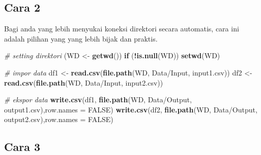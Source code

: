 \documentclass[
]{book}
\newenvironment{Shaded}{\begin{snugshade}}{\end{snugshade}}
\newcommand{\AttributeTok}[1]{\textcolor[rgb]{0.13,0.29,0.53}{#1}}
\newcommand{\CommentTok}[1]{\textcolor[rgb]{0.56,0.35,0.01}{\textit{#1}}}
\newcommand{\ConstantTok}[1]{\textcolor[rgb]{0.56,0.35,0.01}{#1}}
\newcommand{\ControlFlowTok}[1]{\textcolor[rgb]{0.13,0.29,0.53}{\textbf{#1}}}
\newcommand{\FunctionTok}[1]{\textcolor[rgb]{0.13,0.29,0.53}{\textbf{#1}}}
\newcommand{\NormalTok}[1]{#1}
\newcommand{\OtherTok}[1]{\textcolor[rgb]{0.56,0.35,0.01}{#1}}
\newcommand{\SpecialCharTok}[1]{\textcolor[rgb]{0.81,0.36,0.00}{\textbf{#1}}}
\newcommand{\StringTok}[1]{\textcolor[rgb]{0.31,0.60,0.02}{#1}}
\begin{document}
\hypertarget{cara-2}{%
\subsection{Cara 2}\label{cara-2}}

Bagi anda yang lebih menyukai koneksi direktori secara automatis, cara ini adalah pilihan yang yang lebih bijak dan praktis.

\begin{Shaded}
\begin{Highlighting}[]
\CommentTok{\# setting direktori}
\NormalTok{(WD }\OtherTok{\textless{}{-}} \FunctionTok{getwd}\NormalTok{())}
\ControlFlowTok{if}\NormalTok{ (}\SpecialCharTok{!}\FunctionTok{is.null}\NormalTok{(WD)) }\FunctionTok{setwd}\NormalTok{(WD)}
\end{Highlighting}
\end{Shaded}

\begin{Shaded}
\begin{Highlighting}[]
\CommentTok{\# impor data}
\NormalTok{df1 }\OtherTok{\textless{}{-}} \FunctionTok{read.csv}\NormalTok{(}\FunctionTok{file.path}\NormalTok{(WD, }\StringTok{\textquotesingle{}Data/Input\textquotesingle{}}\NormalTok{, }\StringTok{\textquotesingle{}input1.csv\textquotesingle{}}\NormalTok{))}
\NormalTok{df2 }\OtherTok{\textless{}{-}} \FunctionTok{read.csv}\NormalTok{(}\FunctionTok{file.path}\NormalTok{(WD, }\StringTok{\textquotesingle{}Data/Input\textquotesingle{}}\NormalTok{, }\StringTok{\textquotesingle{}input2.csv\textquotesingle{}}\NormalTok{))}

\CommentTok{\# ekspor data}
\FunctionTok{write.csv}\NormalTok{(df1, }\FunctionTok{file.path}\NormalTok{(WD, }\StringTok{\textquotesingle{}Data/Output\textquotesingle{}}\NormalTok{, }\StringTok{\textquotesingle{}output1.csv\textquotesingle{}}\NormalTok{),}\AttributeTok{row.names =} \ConstantTok{FALSE}\NormalTok{)}
\FunctionTok{write.csv}\NormalTok{(df2, }\FunctionTok{file.path}\NormalTok{(WD, }\StringTok{\textquotesingle{}Data/Output\textquotesingle{}}\NormalTok{, }\StringTok{\textquotesingle{}output2.csv\textquotesingle{}}\NormalTok{),}\AttributeTok{row.names =} \ConstantTok{FALSE}\NormalTok{)}
\end{Highlighting}
\end{Shaded}

\hypertarget{cara-3}{%
\subsection{Cara 3}\label{cara-3}}
\end{document}
